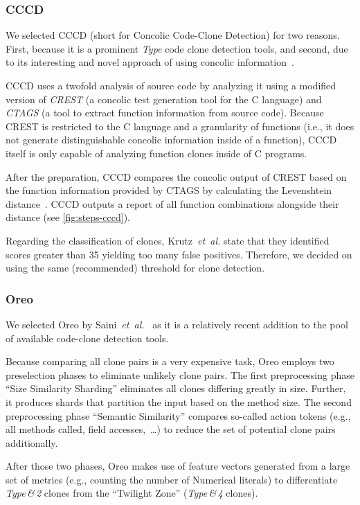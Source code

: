 \documentclass[10pt,journal,compsoc]{IEEEtran}
\def\T#1{\textsl{Type\nobreakdash-#1}}
\begin{document}
\subsubsection{CCCD}
\label{expl:cccd}We selected CCCD (short for Concolic Code-Clone Detection) for two reasons. First, because it is a prominent \T4 code clone detection tools, and second, due to its interesting and novel approach of using concolic information~\cite{krutz2013code}.

CCCD uses a twofold analysis of source code by analyzing it using a modified version of \textsl{CREST} (a concolic test generation tool for the C language) and \textsl{CTAGS} (a tool to extract function information from source code).
Because CREST is restricted to the C language and a granularity of functions (i.e., it does not generate distinguishable concolic information inside of a function), CCCD itself is only capable of analyzing function clones inside of C programs.

After the preparation, CCCD compares the concolic output of CREST based on the function information provided by CTAGS by calculating the Levenshtein distance~\cite{levenshtein1966binary,al2021towards}. CCCD outputs a report of all function combinations alongside their distance (see \cref{fig:steps-cccd}).

Regarding the classification of clones, Krutz~\textsl{et~al.} state that they identified scores greater than 35 yielding too many false positives. Therefore, we decided on using the same (recommended) threshold for clone detection.

\subsubsection{Oreo}\label{sec:oreoX}
We selected Oreo by Saini~\textsl{et~al.}~\cite{saini2018oreo} as it is a relatively recent addition to the pool of available code-clone detection tools.

Because comparing all clone pairs is a very expensive task, Oreo employs two preselection phases to eliminate unlikely clone pairs. The first preprocessing phase \enquote{Size Similarity Sharding} eliminates all clones differing greatly in size. Further, it produces shards that partition the input based on the method size.
The second preprocessing phase \enquote{Semantic Similarity} compares so-called action tokens (e.g., all methods called, field accesses,~\ldots) to reduce the set of potential clone pairs additionally.

After those two phases, Oreo makes use of feature vectors generated from a large set of metrics (e.g., counting the number of Numerical literals) to differentiate \T{1\,\&\,2} clones from the \enquote{Twilight Zone} (\T{3\,\&\,4} clones).
\end{document}
